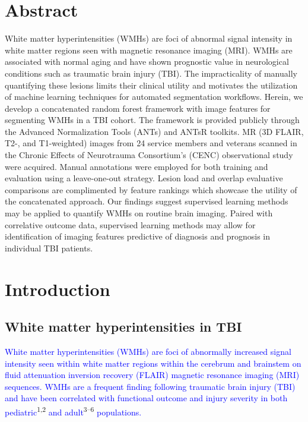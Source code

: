 \documentclass[11pt,]{article}
\title{}
\author{}
\date{}
\begin{document}
\maketitle


\section{Abstract}\label{abstract}

White matter hyperintensities (WMHs) are foci of abnormal signal
intensity in white matter regions seen with magnetic resonance imaging
(MRI). WMHs are associated with normal aging and have shown prognostic
value in neurological conditions such as traumatic brain injury (TBI).
The impracticality of manually quantifying these lesions limits their
clinical utility and motivates the utilization of machine learning
techniques for automated segmentation workflows. Herein, we develop a
concatenated random forest framework with image features for segmenting
WMHs in a TBI cohort. The framework is provided publicly through the
Advanced Normalization Tools (ANTs) and ANTsR toolkits. MR (3D FLAIR,
T2-, and T1-weighted) images from 24 service members and veterans
scanned in the Chronic Effects of Neurotrauma Consortium's (CENC)
observational study were acquired. Manual annotations were employed for
both training and evaluation using a leave-one-out strategy. Lesion load
and overlap evaluative comparisons are complimented by feature rankings
which showcase the utility of the concatenated approach. Our findings
suggest supervised learning methods may be applied to quantify WMHs on
routine brain imaging. Paired with correlative outcome data, supervised
learning methods may allow for identification of imaging features
predictive of diagnosis and prognosis in individual TBI patients.

\clearpage

\section{Introduction}\label{introduction}

\subsection{White matter hyperintensities in
TBI}\label{white-matter-hyperintensities-in-tbi}

\textcolor{blue}{White matter hyperintensities (WMHs) are foci of abnormally increased signal intensity seen within white matter regions within the cerebrum and brainstem on fluid attenuation inversion recovery (FLAIR) magnetic resonance imaging (MRI) sequences.
WMHs are a frequent finding following traumatic brain injury (TBI) and have been correlated with functional outcome and injury severity in both pediatric}\textsuperscript{1,2}
\textcolor{blue}{and adult}\textsuperscript{3--6}
\textcolor{blue}{populations.}
\end{document}
